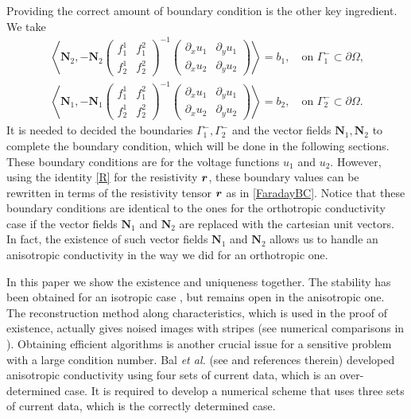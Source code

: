 \documentclass[11pt]{amsart}
\theoremstyle{plain}
\numberwithin{equation}{section}
\numberwithin{Thm}{section}
\def\N{{\mathbf N}}
\def\r{{\bf r}}
\def\r{\mbox{\boldmath$r$}}
\begin{document}
Providing the correct amount of boundary condition is the other key ingredient. We take
\begin{equation} \label{eqn:bdrycondU}
\begin{array}{l}
\left<\N_2 , -\N_2\begin{pmatrix} f^1_1 & f^2_1 \\ f^1_2 &f^2_2  \end{pmatrix}^{-1} \begin{pmatrix} \partial_x u_1 & \partial_y u_1\\ \partial_x u_2 & \partial_y u_2\end{pmatrix}\right> = b_1, \quad \text{on $\Gamma^-_1\subset\partial\Omega$,} \\
\left<\N_1 , -\N_1\begin{pmatrix} f^1_1 & f^2_1 \\ f^1_2 &f^2_2  \end{pmatrix}^{-1} \begin{pmatrix} \partial_x u_1 & \partial_y u_1\\ \partial_x u_2 & \partial_y u_2\end{pmatrix}\right> = b_2, \quad \text{on $\Gamma^-_2\subset\partial\Omega$.}
\end{array}
\end{equation}
It is needed to decided the boundaries $\Gamma_1^-,\Gamma_2^-$ and the vector fields $\N_1,\N_2$ to complete the boundary condition, which will be done in the following sections. These boundary conditions are for the voltage functions $u_1$ and $u_2$. However, using the identity \eqref{R} for the resistivity $\r$, these boundary values can be rewritten in terms of the resistivity tensor $\r$ as in \eqref{FaradayBC}. Notice that these boundary conditions are identical to the ones for the orthotropic conductivity case \cite{lee_orthotropic_2015} if the vector fields $\N_1$ and $\N_2$ are replaced with the cartesian unit vectors. In fact, the existence of such vector fields $\N_1$ and $\N_2$ allows us to handle an anisotropic conductivity in the way we did for an orthotropic one.

In this paper we show the existence and uniqueness together. The stability has been obtained for an isotropic case \cite{lee_well-posedness_2015}, but remains open in the anisotropic one. The reconstruction method along characteristics, which is used in the proof of existence, actually gives noised images with stripes (see numerical comparisons in \cite{lee_virtual_2014}). Obtaining efficient algorithms is another crucial issue for a sensitive problem with a large condition number. Bal \emph{et al.} (see \cite{doi:10.1137/140961754} and references therein) developed anisotropic conductivity using four sets of current data, which is an over-determined case. It is required to develop a numerical scheme that uses three sets of current data, which is the correctly determined case.
\end{document}
